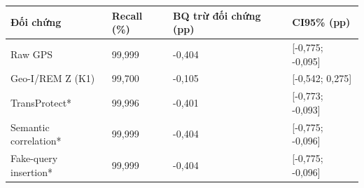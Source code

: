 \par\smallskip\noindent\begin{tabularx}{\linewidth}{@{}P{4.5cm}XXX@{}}\toprule
\textbf{Đối chứng} & \textbf{Recall (\%)} & \textbf{BQ trừ đối chứng (pp)} & \textbf{CI95\% (pp)} \\
\midrule
Raw GPS & 99{,}999 & -0{,}404 & [-0{,}775; -0{,}095] \\
Geo-I/REM Z (K1) & 99{,}700 & -0{,}105 & [-0{,}542; 0{,}275] \\
TransProtect* & 99{,}996 & -0{,}401 & [-0{,}773; -0{,}093] \\
Semantic correlation* & 99{,}999 & -0{,}404 & [-0{,}775; -0{,}096] \\
Fake-query insertion* & 99{,}999 & -0{,}404 & [-0{,}775; -0{,}096] \\
\bottomrule\end{tabularx}\par\smallskip
